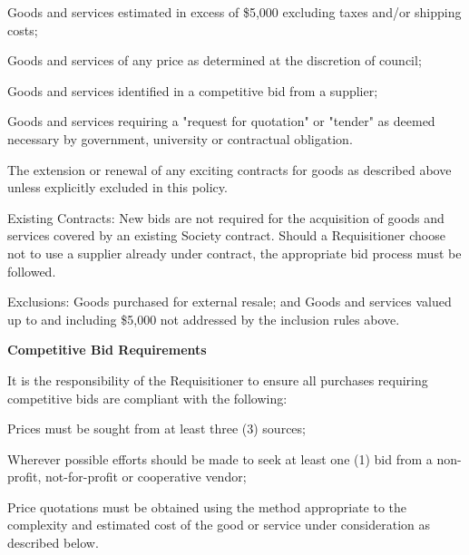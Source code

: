\begin{longenum}[label*=\thesection.\arabic*., align=left]
\begin{longenum} [label*=\arabic*., align=left]
	\item Goods and services estimated in excess of \$5,000 excluding taxes and/or shipping costs;
	\item Goods and services of any price as determined at the discretion of council; 
	\item Goods and services identified in a competitive bid from a supplier;
	\item Goods and services requiring a "request for quotation" or "tender" as deemed necessary by government, university or contractual obligation.
	\item The extension or renewal of any exciting contracts for goods as described above unless explicitly excluded in this policy.
	
	\item Existing Contracts: \newline
	New bids are not required for the acquisition of goods and services covered by an existing Society contract. Should a Requisitioner choose not to use a supplier already under contract, the appropriate bid process must be followed.
	
	\item Exclusions: \newline
	Goods purchased for external resale; and
	Goods and services valued up to and including \$5,000 not addressed by the inclusion rules above.

\end{longenum}

\item \textbf{Competitive Bid Requirements}
\begin{longenum} [label*=\arabic*., align=left]
	\item It is the responsibility of the Requisitioner to ensure all purchases requiring competitive bids are compliant with the following:
		\begin{longenum} [label*=\arabic*., align=left]
	\item Prices must be sought from at least three (3) sources;
	\item Wherever possible efforts should be made to seek at least one (1) bid from a non-profit, not-for-profit or cooperative vendor;
	\item Price quotations must be obtained using the method appropriate to the complexity and estimated cost of the good or service under consideration as described below.
\end{longenum}	
\end{longenum}


\end{longenum}
